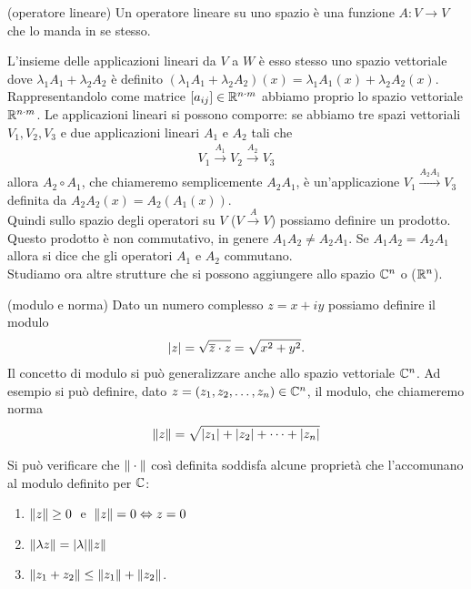 \begin{definition}{(operatore lineare)} 
Un operatore lineare su uno spazio è una funzione $A : V \rightarrow V$ che lo manda in se stesso.
\end{definition} 

L'insieme delle applicazioni lineari da $V$ a $W$ è esso stesso uno spazio vettoriale dove $\lambda_1 A_1 + \lambda_2 A_2$ è definito $\left(\lambda_1 A_1 + \lambda_2 A_2 \right) (x) = \lambda_1 A_1(x) + \lambda_2 A_2(x)$. Rappresentandolo come matrice $\left[a_{ij}\right] \in \mathbb R^{n\cdot m}$ abbiamo proprio lo spazio vettoriale $\mathbb R^{n\cdot m}$. Le applicazioni lineari si possono comporre: se abbiamo tre spazi vettoriali $V_1, V_2, V_3$ e due applicazioni lineari $A_1$ e $A_2$ tali che
\begin{align*}
V_1 \xrightarrow{A_1} V_2 \xrightarrow{A_2} V_3
\end{align*} 
allora $A_2 \circ A_1$, che chiameremo semplicemente $A_2 A_1$, è un'applicazione $V_1 \xrightarrow{A_2 A_1} V_3$ definita da $A_2 A_2 (x) = A_2 \left(A_1(x)\right)$.\\
Quindi sullo spazio degli operatori su $V$ ($V \xrightarrow{A} V$) possiamo definire un prodotto. Questo prodotto è non commutativo, in genere $A_1A_2 \neq A_2A_1$. Se $A_1A_2 = A_2A_1$ allora si dice che gli operatori $A_1$ e $A_2$ commutano.\\

Studiamo ora altre strutture che si possono aggiungere allo spazio $\mathbb C^n$ o ($\mathbb R^n$).

\begin{definition}{(modulo e norma)} 
Dato un numero complesso $z = x + iy$ possiamo definire il modulo 
\begin{align*}
{\left|z\right|} = \sqrt{\overline{z}\cdot z} = \sqrt{x^2 + y^2}.
\end{align*} 
Il concetto di modulo si può generalizzare anche allo spazio vettoriale $\mathbb C^n$. Ad esempio si può definire, dato $z = (z_1, z_2, \ldots, z_n) \in \mathbb C^n$, il modulo, che chiameremo norma
\begin{align*}
{\|z\|} = \sqrt{{\left|z_1\right|} + {\left|z_2\right|} + \cdots + {\left|z_n\right|}}
\end{align*}
\end{definition}

Si può verificare che ${\|\cdot\|}$ così definita soddisfa alcune proprietà che l'accomunano al modulo definito per $\mathbb C$:
\begin{enumerate}
\item ${\|z\|} \geq 0\;$	e $\; {\|z\|} = 0 \Leftrightarrow z=0$
\item ${\|\lambda z\|} = {\left|\lambda\right|} {\|z\|}$
\item ${\|z_1 + z_2\|} \leq {\|z_1\|} + {\|z_2\|}$.
\end{enumerate} 

